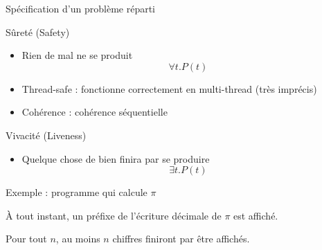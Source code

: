 
\begingroup

\begin{frame}{Spécification d'un problème réparti}
  \begin{block}{Sûreté (Safety)}
    \begin{itemize}
    \item Rien de mal ne se produit
      $$\forall t. P(t)$$
    \item Thread-safe : fonctionne correctement en multi-thread (très imprécis)
    \item Cohérence : cohérence séquentielle
    \end{itemize}
  \end{block}
  \begin{block}{Vivacité (Liveness)}
    \begin{itemize}
    \item Quelque chose de bien finira par se produire
      $$\exists t. P(t)$$
    \end{itemize}
  \end{block}
  \begin{exampleblock}{Exemple : programme qui calcule $\pi$}
    \begin{description}[Vivacité :]
    \item[Sûreté :] \alert{À tout instant}, un préfixe
      de l'écriture décimale de $\pi$ est affiché.
    \item[Vivacité :] Pour tout $n$,
      au moins $n$ chiffres \alert{finiront par} être affichés.
    \end{description}
  \end{exampleblock}
\end{frame}

\endgroup
\endinput
